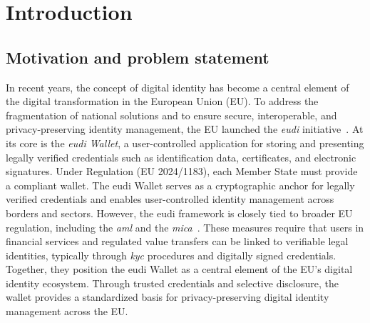 \chapter{Introduction}
\label{chap:introduction}

\section{Motivation and problem statement}
\label{sec:motivation-problem-statement}
In recent years, the concept of digital identity has become a central element of the digital transformation in the European Union (EU). To address the fragmentation of national solutions and to ensure secure, interoperable, and privacy-preserving identity management, the EU launched the \textit{\acrfull{eudi}} initiative~\cite{EUCommission2021, EURegulation2024}. At its core is the \textit{\acrshort{eudi} Wallet}, a user-controlled application for storing and presenting legally verified credentials such as identification data, certificates, and electronic signatures. Under Regulation (EU 2024/1183), each Member State must provide a compliant wallet. The \acrshort{eudi} Wallet serves as a cryptographic anchor for legally verified credentials and enables user-controlled identity management across borders and sectors. However, the \acrshort{eudi} framework is closely tied to broader EU regulation, including the \textit{\acrfull{aml}} and the \textit{\acrfull{mica}}~\cite{EUDirective2015AML,EURegulation2023MiCA}. These measures require that users in financial services and regulated value transfers can be linked to verifiable legal identities, typically through \textit{\acrfull{kyc}} procedures and digitally signed credentials. Together, they position the \acrshort{eudi} Wallet as a central element of the EU's digital identity ecosystem. Through trusted credentials and selective disclosure, the wallet provides a standardized basis for privacy-preserving digital identity management across the EU.

